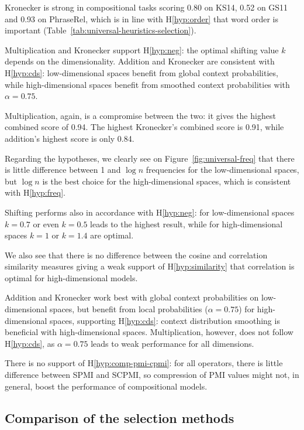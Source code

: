 Kronecker is strong in compositional tasks scoring 0.80 on KS14, 0.52 on GS11 and 0.93 on PhraseRel, which is in line with H\ref{hyp:order} that word order is important (Table~\ref{tab:universal-heuristics-selection}).

Multiplication and Kronecker support H\ref{hyp:neg}: the optimal shifting value $k$ depends on the dimensionality. Addition and Kronecker are consistent with H\ref{hyp:cds}: low-dimensional spaces benefit from global context probabilities, while high-dimensional spaces benefit from smoothed context probabilities with $\alpha=0.75$.

Multiplication, again, is a compromise between the two: it gives the highest combined score of 0.94. The highest Kronecker's combined score is 0.91, while addition's highest score is only 0.84.

Regarding the hypotheses, we clearly see on Figure~\ref{fig:universal-freq} that there is little difference between 1 and $\log n$ frequencies for the low-dimensional spaces, but $\log n$ is the best choice for the high-dimensional spaces, which is consistent with H\ref{hyp:freq}.

Shifting performs also in accordance with H\ref{hyp:neg}: for low-dimensional spaces $k=0.7$ or even $k=0.5$ leads to the highest result, while for high-dimensional spaces $k=1$ or $k=1.4$ are optimal.

We also see that there is no difference between the cosine and correlation similarity measures giving a weak support of H\ref{hyp:similarity} that correlation is optimal for high-dimensional models.

Addition and Kronecker work best with global context probabilities on low-dimensional spaces, but benefit from local probabilities ($\alpha=0.75$) for high-dimensional spaces, supporting H\ref{hyp:cds}: context distribution smoothing is beneficial with high-dimensional spaces. Multiplication, however, does not follow H\ref{hyp:cds}, as $\alpha=0.75$ leads to weak performance for all dimensions.

There is no support of H\ref{hyp:comp-pmi-cpmi}: for all operators, there is little difference between SPMI and SCPMI, so compression of PMI values might not, in general, boost the performance of compositional models.

\subsection{Comparison of the selection methods}
\label{sec:comparison-universal}

